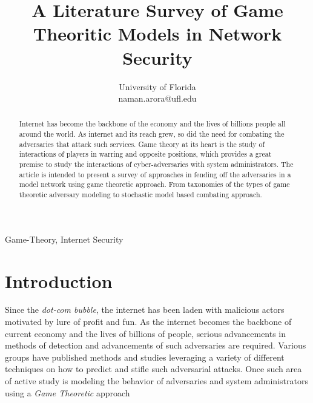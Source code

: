 \documentclass[conference]{IEEEtran}
\begin{document}
\title{A Literature Survey of Game Theoritic Models in Network Security}

\author{
        University of Florida\\
        naman.arora@ufl.edu }

\maketitle

\begin{abstract}
        Internet has become the backbone of the economy and the lives of billions people all around the world.
        As internet and its reach grew, so did the need for combating the adversaries that attack such services.
        Game theory at its heart is the study of interactions of players in warring and opposite positions, which provides a great premise to study the interactions of cyber-adversaries with system administrators.
        The article is intended to present a survey of approaches in fending off the adversaries in a model network using game theoretic approach.
        From taxonomies of the types of game theoretic adversary modeling to stochastic model based combating approach.
\end{abstract}

\begin{IEEEkeywords}
        Game-Theory, Internet Security
\end{IEEEkeywords}

\section*{Introduction}
Since the \textit{dot-com bubble}, the internet has been laden with malicious actors motivated by lure of profit and fun.
As the internet becomes the backbone of current economy and the lives of billions of people, serious advancements in methods of detection and advancements of such adversaries are required.
Various groups have published methods and studies leveraging a variety of different techniques on how to predict and stifle such adversarial attacks.
Once such area of active study is modeling the behavior of adversaries and system administrators using a \textit{Game Theoretic} approach
\end{document}
